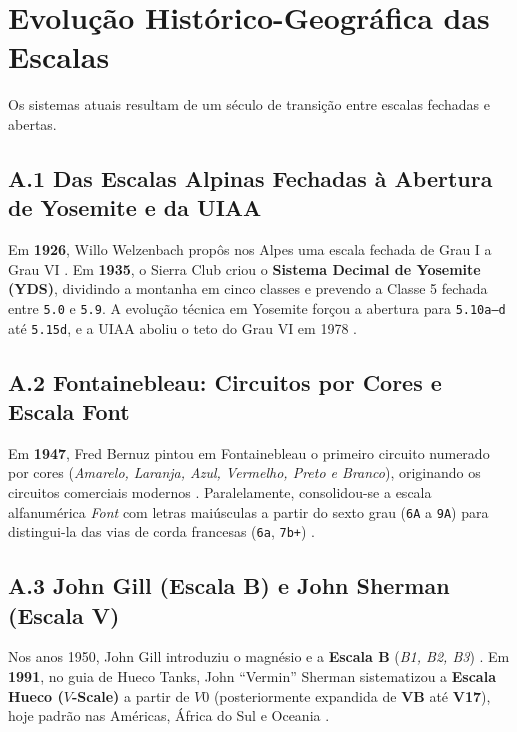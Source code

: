\section{Evolução Histórico-Geográfica das Escalas}

Os sistemas atuais resultam de um século de transição entre escalas fechadas e abertas.

\subsection*{A.1 Das Escalas Alpinas Fechadas à Abertura de Yosemite e da UIAA}
Em \textbf{1926}, Willo Welzenbach propôs nos Alpes uma escala fechada de Grau I a Grau VI \cite{uiaa_history}. Em \textbf{1935}, o Sierra Club criou o \textbf{Sistema Decimal de Yosemite (YDS)}, dividindo a montanha em cinco classes e prevendo a Classe 5 fechada entre \texttt{5.0} e \texttt{5.9}. A evolução técnica em Yosemite forçou a abertura para \texttt{5.10a--d} até \texttt{5.15d}, e a UIAA aboliu o teto do Grau VI em 1978 \cite{uiaa_history, sportrock_grades}.

\subsection*{A.2 Fontainebleau: Circuitos por Cores e Escala Font}
Em \textbf{1947}, Fred Bernuz pintou em Fontainebleau o primeiro circuito numerado por cores (\textit{Amarelo, Laranja, Azul, Vermelho, Preto e Branco}), originando os circuitos comerciais modernos \cite{climbski_font, arkose_niveaux}. Paralelamente, consolidou-se a escala alfanumérica \textit{Font} com letras maiúsculas a partir do sexto grau (\texttt{6A} a \texttt{9A}) para distingui-la das vias de corda francesas (\texttt{6a}, \texttt{7b+}) \cite{bmc_grades, actugrimpe_niveaux}.

\subsection*{A.3 John Gill (Escala B) e John Sherman (Escala V)}
Nos anos 1950, John Gill introduziu o magnésio e a \textbf{Escala B} (\textit{B1, B2, B3}) \cite{movement_vgrades}. Em \textbf{1991}, no guia de Hueco Tanks, John ``Vermin'' Sherman sistematizou a \textbf{Escala Hueco ($V$-Scale)} a partir de $V0$ (posteriormente expandida de \textbf{VB} até \textbf{V17}), hoje padrão nas Américas, África do Sul e Oceania \cite{sherman_hueco, cityrock_guide}.

